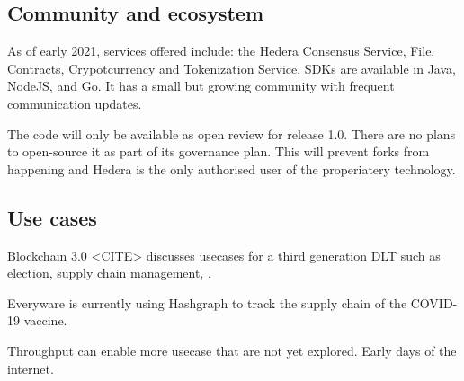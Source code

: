 \subsection{Community and ecosystem}

As of early 2021, services offered include: the Hedera Consensus Service, File, Contracts, Crypotcurrency and Tokenization Service. SDKs are available in Java, NodeJS, and Go. It has a small but growing community with frequent communication updates.

The code will only be available as open review for release 1.0. There are no plans to open-source it as part of its governance plan. This will prevent forks from happening and Hedera is the only authorised user of the properiatery technology.

\subsection{Use cases}

Blockchain 3.0 <CITE> discusses usecases for a third generation DLT such as election, supply chain management, .


Everyware is currently using Hashgraph to track the supply chain of the COVID-19 vaccine.



Throughput can enable more usecase that are not yet explored. Early days of the internet.

